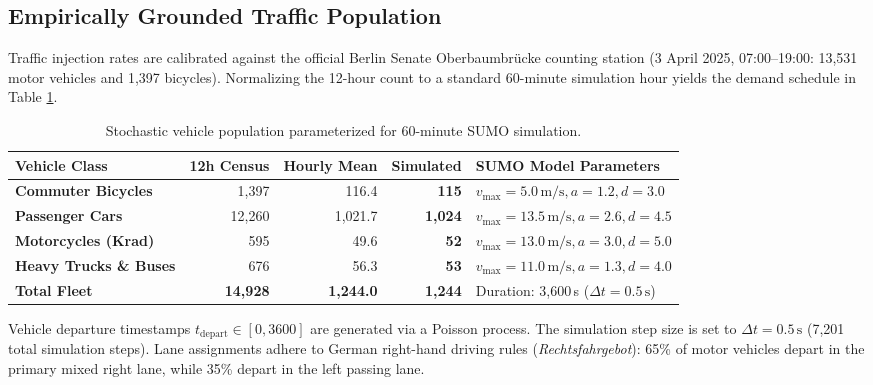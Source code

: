 \subsection{Empirically Grounded Traffic Population}
Traffic injection rates are calibrated against the official Berlin Senate Oberbaumbr{\"u}cke counting station (3 April 2025, 07:00--19:00: 13,531 motor vehicles and 1,397 bicycles). Normalizing the 12-hour count to a standard 60-minute simulation hour yields the demand schedule in Table \ref{tab:sim_demand}.

\begin{table}[h!]
	\centering
	\caption{Stochastic vehicle population parameterized for 60-minute SUMO simulation.}
	\label{tab:sim_demand}
	\setlength{\tabcolsep}{6pt}
	\renewcommand{\arraystretch}{1.2}
	\begin{tabularx}{\textwidth}{|>{\raggedright\arraybackslash\bfseries}p{3.8cm}|r|r|r|X|}
		\hline
		\textbf{Vehicle Class} & \textbf{12h Census} & \textbf{Hourly Mean} & \textbf{Simulated} & \textbf{SUMO Model Parameters} \\
		\hline
		\hline
		Commuter Bicycles & 1,397 & 116.4 & \textbf{115} & $v_{\text{max}} = 5.0\,\text{m/s}, a = 1.2, d = 3.0$ \\
		Passenger Cars & 12,260 & 1,021.7 & \textbf{1,024} & $v_{\text{max}} = 13.5\,\text{m/s}, a = 2.6, d = 4.5$ \\
		Motorcycles (Krad) & 595 & 49.6 & \textbf{52} & $v_{\text{max}} = 13.0\,\text{m/s}, a = 3.0, d = 5.0$ \\
		Heavy Trucks \& Buses & 676 & 56.3 & \textbf{53} & $v_{\text{max}} = 11.0\,\text{m/s}, a = 1.3, d = 4.0$ \\
		\hline
		\textbf{Total Fleet} & \textbf{14,928} & \textbf{1,244.0} & \textbf{1,244} & Duration: 3,600\,s ($\Delta t = 0.5\,\text{s}$) \\
		\hline
	\end{tabularx}
\end{table}

Vehicle departure timestamps $t_{\text{depart}} \in [0, 3600]$ are generated via a Poisson process. The simulation step size is set to $\Delta t = 0.5\,\text{s}$ (7,201 total simulation steps). Lane assignments adhere to German right-hand driving rules (\textit{Rechtsfahrgebot}): 65\% of motor vehicles depart in the primary mixed right lane, while 35\% depart in the left passing lane.

